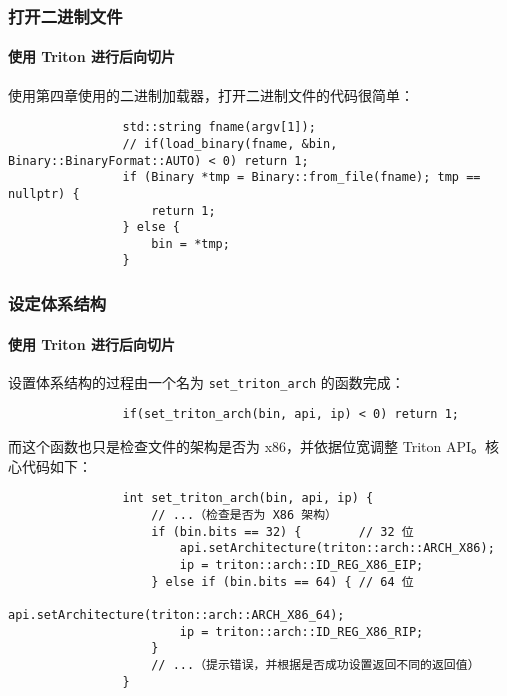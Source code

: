 \documentclass{ctexbeamer}
\begin{document}
    \begin{frame}[fragile]
        \frametitle{打开二进制文件}
        \framesubtitle{使用 Triton 进行后向切片}
    
        使用第四章使用的二进制加载器，打开二进制文件的代码很简单：

        {
            \small
            \begin{verbatim}
                std::string fname(argv[1]);
                // if(load_binary(fname, &bin, Binary::BinaryFormat::AUTO) < 0) return 1;
                if (Binary *tmp = Binary::from_file(fname); tmp == nullptr) {
                    return 1;
                } else {
                    bin = *tmp;
                }
            \end{verbatim}
        }
    \end{frame}

    \begin{frame}[fragile]
        \frametitle{设定体系结构}
        \framesubtitle{使用 Triton 进行后向切片}
    
        设置体系结构的过程由一个名为 \texttt{set_triton_arch} 的函数完成：

        {
            \footnotesize
            \begin{verbatim}
                if(set_triton_arch(bin, api, ip) < 0) return 1;
            \end{verbatim}
        }
        \pause
        而这个函数也只是检查文件的架构是否为 x86，并依据位宽调整 Triton API。核心代码如下：

        {
            \footnotesize
            \begin{verbatim}
                int set_triton_arch(bin, api, ip) {
                    // ...（检查是否为 X86 架构）
                    if (bin.bits == 32) {        // 32 位
                        api.setArchitecture(triton::arch::ARCH_X86);
                        ip = triton::arch::ID_REG_X86_EIP;
                    } else if (bin.bits == 64) { // 64 位
                        api.setArchitecture(triton::arch::ARCH_X86_64);
                        ip = triton::arch::ID_REG_X86_RIP;
                    }
                    // ...（提示错误，并根据是否成功设置返回不同的返回值）
                }
            \end{verbatim}
        }
    
    \end{frame}
\end{document}

